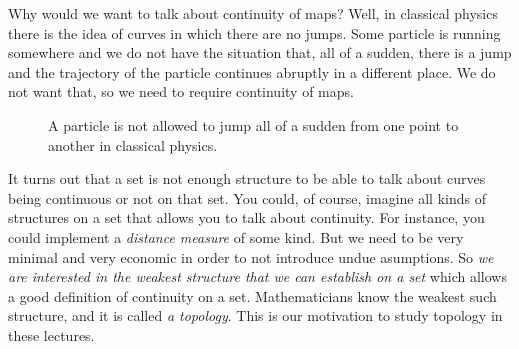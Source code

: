 Why would we want to talk about continuity of maps? Well, in classical physics
there is the idea of curves in which there are no jumps. Some particle is
running somewhere and we do not have the situation that, all of a sudden, there
is a jump and the trajectory of the particle continues abruptly in a different
place. We do not want that, so we need to require continuity of maps.
\begin{figure}[ht]
  \centering
  \def\scl{1}
  \caption{A particle is not allowed to jump all of a sudden from one point to another
    in classical physics.}
  \label{fig:topspac-nojumps}
\end{figure}

It turns out that a set is not enough structure to be able to talk about curves
being continuous or not on that set. You could, of course, imagine all kinds of
structures on a set that allows you to talk about continuity. For instance, you
could implement a \emph{distance measure} of some kind.
But we need to be very minimal and very economic in order to not introduce
undue asumptions.
So \emph{we are interested in the weakest structure that we can establish on a set}
which allows a good definition of continuity on a set. Mathematicians know the
weakest such structure, and it is called \emph{a topology}.
This is our motivation to study topology in these lectures.


